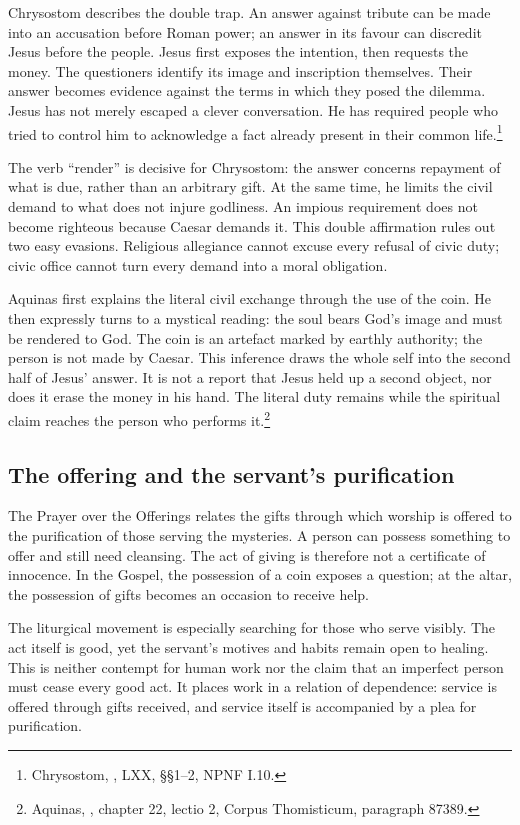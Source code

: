Chrysostom describes the double trap. An answer against tribute can be made into an accusation before Roman power; an answer in its favour can discredit Jesus before the people. Jesus first exposes the intention, then requests the money. The questioners identify its image and inscription themselves. Their answer becomes evidence against the terms in which they posed the dilemma. Jesus has not merely escaped a clever conversation. He has required people who tried to control him to acknowledge a fact already present in their common life.\footnote{Chrysostom, , LXX, §§1--2, NPNF I.10.}

The verb ``render'' is decisive for Chrysostom: the answer concerns repayment of what is due, rather than an arbitrary gift. At the same time, he limits the civil demand to what does not injure godliness. An impious requirement does not become righteous because Caesar demands it. This double affirmation rules out two easy evasions. Religious allegiance cannot excuse every refusal of civic duty; civic office cannot turn every demand into a moral obligation.

Aquinas first explains the literal civil exchange through the use of the coin. He then expressly turns to a mystical reading: the soul bears God's image and must be rendered to God. The coin is an artefact marked by earthly authority; the person is not made by Caesar. This inference draws the whole self into the second half of Jesus' answer. It is not a report that Jesus held up a second object, nor does it erase the money in his hand. The literal duty remains while the spiritual claim reaches the person who performs it.\footnote{Aquinas, , chapter 22, lectio 2, Corpus Thomisticum, paragraph 87389.}

\subsection{The offering and the servant's purification}
The Prayer over the Offerings relates the gifts through which worship is offered to the purification of those serving the mysteries. A person can possess something to offer and still need cleansing. The act of giving is therefore not a certificate of innocence. In the Gospel, the possession of a coin exposes a question; at the altar, the possession of gifts becomes an occasion to receive help.

The liturgical movement is especially searching for those who serve visibly. The act itself is good, yet the servant's motives and habits remain open to healing. This is neither contempt for human work nor the claim that an imperfect person must cease every good act. It places work in a relation of dependence: service is offered through gifts received, and service itself is accompanied by a plea for purification.

